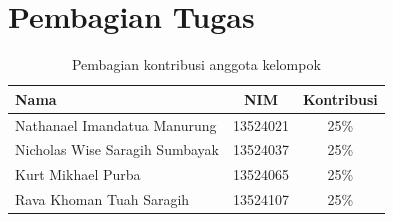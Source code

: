\documentclass[12pt,a4paper]{article}
\begin{document}
\section*{Pembagian Tugas}

\begin{table}[H]
  \centering
  \begin{tabular}{>{\raggedright\arraybackslash}p{7.6cm}cc}
    \toprule
    \textbf{Nama} & \textbf{NIM} & \textbf{Kontribusi} \\
    \midrule
    Nathanael Imandatua Manurung & 13524021 & 25\% \\
    Nicholas Wise Saragih Sumbayak & 13524037 & 25\% \\
    Kurt Mikhael Purba & 13524065 & 25\% \\
    Rava Khoman Tuah Saragih & 13524107 & 25\% \\
    \bottomrule
  \end{tabular}
  \caption{Pembagian kontribusi anggota kelompok}
\end{table}
\end{document}
